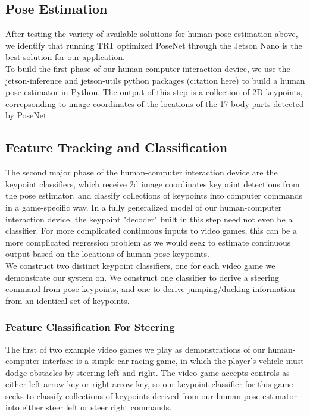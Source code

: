 \documentclass[10pt,twocolumn,letterpaper]{article}
\begin{document}
\subsection{Pose Estimation}
After testing the variety of available solutions for human pose estimation 
above, we identify that running TRT optimized PoseNet through the Jetson Nano 
is the best solution for our application.\\

To build the first phase of our human-computer interaction device, we use the 
jetson-inference and jetson-utils python packages (citation here) 
to build a human pose estimator in Python. The output of this step is a 
collection of 2D keypoints, correpsonding to image coordinates of the locations 
of the 17 body parts detected by PoseNet.

\subsection{Feature Tracking and Classification}
The second major phase of the human-computer interaction device are the 
keypoint classifiers, which receive 2d image coordinates keypoint detections 
from the pose estimator, and classify collections of keypoints into computer 
commands in a game-specific way. In a fully generalized model of our 
human-computer interaction device, the keypoint "decoder" built in this step 
need not even be a classifier. For more complicated continuous inputs to 
video games, this can be a more complicated regression problem as we would 
seek to estimate continuous output based on the locations of human pose 
keypoints.\\

We construct two distinct keypoint classifiers, one for each video game we 
demonstrate our system on. We construct one classifier to derive a steering 
command from pose keypoints, and one to derive jumping/ducking information 
from an identical set of keypoints.

\subsubsection{Feature Classification For Steering}
The first of two example video games we play as demonstrations of our 
human-computer interface is a simple car-racing game, in which the player's 
vehicle must dodge obstacles by steering left and right. The video game 
accepts controls as either left arrow key or right arrow key, so our 
keypoint classifier for this game seeks to classify collections of keypoints 
derived from our human pose estimator into either steer left or steer right 
commands.\\
\end{document}
